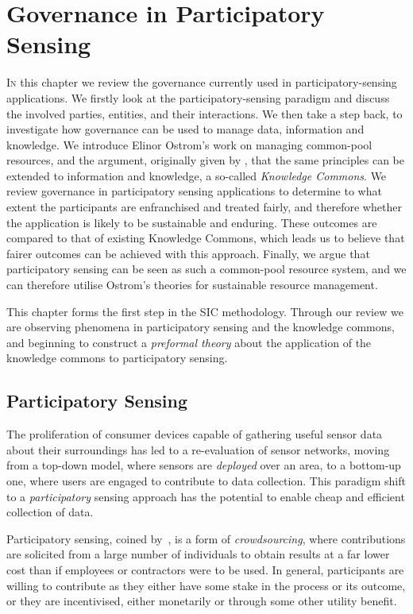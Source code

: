 \acresetall
\chapter{Governance in Participatory Sensing}\label{ch:kc}

\lettrine[lines=3]{I}{n} this chapter we review the governance currently used in 
participatory-sensing applications. We firstly look at the participatory-sensing paradigm
and discuss the involved parties, entities, and their interactions. We then
take a step back, to investigate how governance can be used to manage data,
information and knowledge. We introduce Elinor Ostrom's work on managing
common-pool resources, and the argument, originally given by
\citet{Ostrom2003}, that the same principles can be extended to information
and knowledge, a so-called \emph{Knowledge Commons}. We review governance in participatory sensing
applications to determine to what extent the participants are enfranchised and
treated fairly, and therefore whether the application is likely to be
sustainable and enduring. These outcomes are compared to that of existing
Knowledge Commons, which leads us to believe that fairer outcomes can be
achieved with this approach. Finally, we argue that
participatory sensing can be seen as such a common-pool resource system, and we can
therefore utilise Ostrom's theories for sustainable resource
management. 

This chapter forms the first step in the \ac{SIC} methodology. Through our
review we are observing phenomena in participatory sensing and the knowledge
commons, and beginning to construct a \emph{preformal theory} about the application of the
knowledge commons to participatory sensing.

\section{Participatory Sensing}\label{sec:psense}

The proliferation of consumer devices capable of gathering useful sensor data
about their surroundings has led to a re-evaluation of sensor networks, moving
from a top-down model, where sensors are \emph{deployed} over an area, to a
bottom-up one, where users are engaged to contribute to data collection. This
paradigm shift to a \emph{participatory} sensing approach has the potential to
enable cheap and efficient collection of data.

Participatory sensing, coined by~\citet{Burke2006}, is a form of
\emph{crowdsourcing}, where contributions are solicited from a large number of
individuals to obtain results at a far lower cost than if employees or
contractors were to be used. In general, participants are willing to
contribute as they either have some stake in the process or its outcome, or
they are incentivised, either monetarily or through some other utility
benefit.

